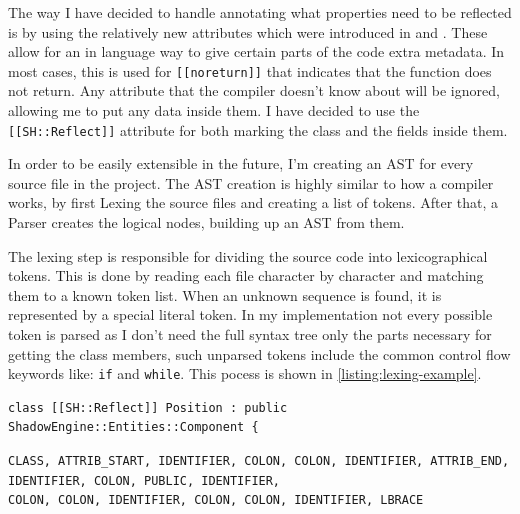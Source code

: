 The way I have decided to handle annotating what properties need to be reflected is by using the relatively new \Cpp attributes which were introduced in  and  \cite{cpp-attributes}.
These allow for an in language way to give certain parts of the code extra metadata. In most cases, this is used for \verb|[[noreturn]]| that indicates that the function does not return. Any attribute that the compiler doesn't know about will be ignored, allowing me to put any data inside them.
I have decided to use the \verb|[[SH::Reflect]]| attribute for both marking the class and the fields inside them.

In order to be easily extensible in the future, I'm creating an AST for every source file in the project. The AST creation is highly similar to how a compiler works, by first Lexing the source files and creating a list of tokens. After that, a Parser creates the logical nodes, building up an AST from them.

The lexing step is responsible for dividing the source code into lexicographical tokens.
This is done by reading each file character by character and matching them to a known token list. When an unknown sequence is found, it is represented by a special literal token. In my implementation not every possible \Cpp token is parsed as I don't need the full syntax tree only the parts necessary for getting the class members, such unparsed tokens include the common control flow keywords like: \verb|if| and \verb|while|. This pocess is shown in \autoref{listing:lexing-example}.

\begin{listing}[h]

    \begin{minipage}[b]{1\linewidth}
        \begin{verbatim}
class [[SH::Reflect]] Position : public ShadowEngine::Entities::Component {
        \end{verbatim}
    \end{minipage}

    \begin{minipage}[b]{1\linewidth}
        \begin{verbatim}
CLASS, ATTRIB_START, IDENTIFIER, COLON, COLON, IDENTIFIER, ATTRIB_END,
IDENTIFIER, COLON, PUBLIC, IDENTIFIER,
COLON, COLON, IDENTIFIER, COLON, COLON, IDENTIFIER, LBRACE
        \end{verbatim}
    \end{minipage}

    \caption{Example of the lexing step}
    \label{listing:lexing-example}
\end{listing}


